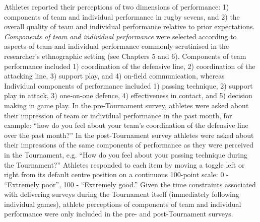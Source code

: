 Athletes reported their perceptions of two dimensions of performance: 1) components of team and individual performance in rugby sevens, and 2) the overall quality of team and individual performance relative to prior expectations.  \textit{Components of team and individual performance} were selected according to aspects of team and  individual performance commonly scrutinised in the researcher's ethnographic setting (see Chapters 5 and 6).  Components of team performance included 1) coordination of the defensive line, 2) coordination of the attacking line, 3) support play, and 4) on-field communication, whereas Individual components of performance included 1) passing technique, 2) support play in attack, 3) one-on-one defence, 4) effectiveness in contact, and 5) decision making in game play.  In the pre-Tournament survey, athletes were asked about their impression of team or individual performance in the past month, for example: ``how do you feel about your team's coordination of the defensive line over the past month?''  In the post-Tournament survey athletes were asked about their impressions of the same components of performance as they were perceived in the Tournament, e.g. ``How do you feel about your passing technique during the Tournament?'' Athletes responded to each item by moving a toggle left or right from its default centre position on a continuous 100-point scale: 0 - ``Extremely poor'', 100 - ``Extremely good.''  Given the time constraints associated with delivering surveys during the Tournament itself (immediately following individual games), athlete perceptions of components of team and individual performance were only included in the pre- and post-Tournament surveys.

